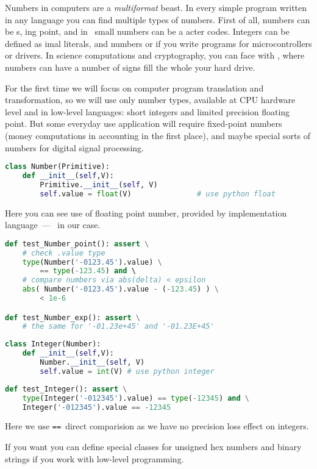 \clearpage{}

Numbers in computers are a \emph{multiformat} beast. In every simple program
written in any language you can find multiple types of numbers. First of all,
numbers can be s, ing point, and in \cpp\ small
numbers can be a acter codes. Integers can be defined as
imal literals, and  numbers or  if you
write programs for microcontrollers or drivers. In science computations and
cryptography, you can face with , where
numbers can have a number of signs fill the whole your hard drive.

For the first time we will focus on computer program translation and
transformation, so we will use only number types, available at CPU hardware
level and in low-level languages: short integers and limited precision floating
point. But some everyday use application will require fixed-point numbers (money
computations in accounting in the first place), and maybe special sorts of
numbers for digital signal processing.

\begin{lstlisting}[language=Python]
class Number(Primitive):
	def __init__(self,V):
		Primitive.__init__(self, V)
		self.value = float(V)				# use python float
\end{lstlisting}

\noindent
Here you can see use of floating point number, provided by implementation
language\ --- \py\ in our case.

\clearpage
\begin{lstlisting}[language=Python]
def test_Number_point(): assert \
	# check .value type
	type(Number('-0123.45').value) \
		== type(-123.45) and \			
	# compare numbers via abs(delta) < epsilon
	abs( Number('-0123.45').value - (-123.45) ) \
		< 1e-6

def test_Number_exp(): assert \
	# the same for '-01.23e+45' and '-01.23E+45' 
\end{lstlisting}

\clearpage
\begin{lstlisting}[language=Python]
class Integer(Number):
    def __init__(self,V):
        Number.__init__(self, V)
        self.value = int(V) # use python integer
\end{lstlisting}
\begin{lstlisting}[language=Python]
def test_Integer(): assert \
    type(Integer('-012345').value) == type(-12345) and \
    Integer('-012345').value == -12345
\end{lstlisting}
Here we use \verb|==|\ direct comparision as we have no precision loss effect
on integers.

\bigskip\noindent
If you want you can define special classes for unsigned hex numbers and binary strings if you work with low-level programming.
